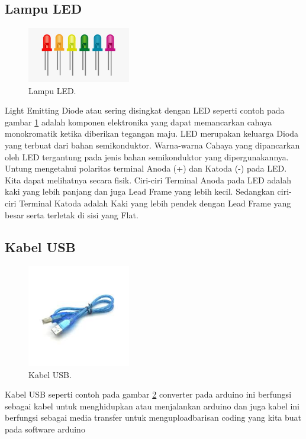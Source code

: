 \subsection{Lampu LED}
\begin{figure}[ht]
\centerline{\includegraphics[width=0.4\textwidth]{figures/led.jpg}}
\caption{Lampu LED.}
\label{led}
\end{figure}
Light Emitting Diode atau sering disingkat dengan LED seperti contoh pada gambar \ref{led} adalah komponen elektronika yang dapat memancarkan  cahaya monokromatik ketika diberikan tegangan maju. LED merupakan keluarga Dioda yang terbuat dari bahan semikonduktor. Warna-warna Cahaya yang dipancarkan oleh LED tergantung pada jenis bahan semikonduktor yang dipergunakannya.
Untung mengetahui polaritas terminal Anoda (+) dan Katoda (-) pada LED. Kita dapat melihatnya secara fisik. Ciri-ciri Terminal Anoda pada LED adalah kaki yang lebih panjang dan juga Lead Frame yang lebih kecil. Sedangkan ciri-ciri Terminal Katoda adalah Kaki yang lebih pendek dengan Lead Frame yang besar serta terletak di sisi yang Flat.
\subsection{Kabel USB}
\begin{figure}[ht]
\centerline{\includegraphics[width=0.4\textwidth]{figures/usb.jpg}}
\caption{Kabel USB.}
\label{usb}
\end{figure}
Kabel USB seperti contoh pada gambar \ref{usb} converter pada arduino ini berfungsi sebagai kabel untuk menghidupkan atau menjalankan arduino dan juga kabel ini berfungsi sebagai media transfer untuk menguploadbarisan coding yang kita buat pada software arduino

